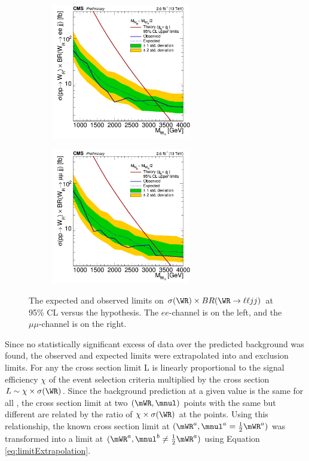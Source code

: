 \begin{figure}
	\centering
	\begin{subfigure}[t]{2.4in}
		\centering
		\includegraphics[width=2.4in]{figures/limWReejj_SHv19700toysAprilTwentyThree.png}
	\end{subfigure}
	\thickspace
	\begin{subfigure}[t]{2.4in}
		\centering
		\includegraphics[width=2.4in]{figures/limWRmumujj_SHv19700toysAprilTwentyThree.png}
	\end{subfigure}
	\caption{The expected and observed limits on $\sigma(\WR) \times BR(\WR \rightarrow \ell\ell jj)$ at 95\% CL versus the \mWR 
		hypothesis.  The $ee$-channel is on the left, and the $\mu\mu$-channel is on the right.}
	\label{fig:oneDimLimits}
\end{figure}

Since no statistically significant excess of data over the predicted background was found, the observed and expected limits 
were extrapolated into \mnul and \mWR exclusion limits.  For any \mnul the cross section limit L is linearly proportional to the signal 
efficiency $\chi$ of the event selection criteria multiplied by the \WR cross section $L \sim \chi \times \sigma(\WR)$.  Since 
the background prediction at a given \mWR value is the same for all \mnul, the cross section limit at two $(\mWR,\mnul)$ points 
with the same \mWR but different \mnul are related by the ratio of $\chi \times \sigma(\WR)$ at the points.  Using this relationship, 
the known cross section limit at $(\mWR^{a}, \mnul^{a} = \frac{1}{2}\mWR^{a})$ was transformed into a limit at 
$(\mWR^{a}, \mnul^{b} \neq \frac{1}{2}\mWR^{a})$ using Equation \ref{eq:limitExtrapolation}.


